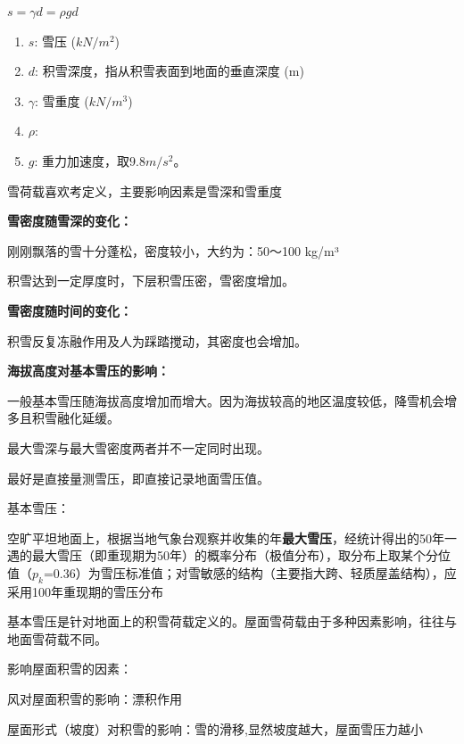 \documentclass[12pt, a4paper, oneside, UTF8]{ctexbook}
\begin{document}
\begin{definition}
    $s = \gamma d = \rho g d$
\begin{enumerate}
    \item $s$: 雪压 ($kN/m^2$)
    \item $d$: 积雪深度，指从积雪表面到地面的垂直深度 (m)
    \item $\gamma$: 雪重度 ($kN/m^3$)
    \item $\rho$: 
    \item $g$: 重力加速度，取$9.8m/s^2$。
\end{enumerate}
\label{eq:snow_pressure}
\end{definition}

\begin{remark}
    雪荷载喜欢考定义，主要影响因素是雪深和雪重度
\end{remark}

\textbf{雪密度随雪深的变化：}

刚刚飘落的雪十分蓬松，密度较小，大约为：50～100 kg/m³

积雪达到一定厚度时，下层积雪压密，雪密度增加。

\textbf{雪密度随时间的变化：}

积雪反复冻融作用及人为踩踏搅动，其密度也会增加。

\textbf{海拔高度对基本雪压的影响：}

一般基本雪压随海拔高度增加而增大。因为海拔较高的地区温度较低，降雪机会增多且积雪融化延缓。

\begin{remark}
    最大雪深与最大雪密度两者并不一定同时出现。

最好是直接量测雪压，即直接记录地面雪压值。
\end{remark}

\begin{definition}
    基本雪压：

空旷平坦地面上，根据当地气象台观察并收集的年\textbf{最大雪压}，经统计得出的50年一遇的最大雪压（即重现期为50年）的概率分布（极值分布），取分布上取某个分位值（\( p_k \)=0.36）为雪压标准值；对雪敏感的结构（主要指大跨、轻质屋盖结构），应采用100年重现期的雪压分布
\end{definition}

基本雪压是针对地面上的积雪荷载定义的。屋面雪荷载由于多种因素影响，往往与地面雪荷载不同。

影响屋面积雪的因素：

风对屋面积雪的影响：漂积作用

屋面形式（坡度）对积雪的影响：雪的滑移,{\color{red}显然坡度越大，屋面雪压力越小}
\end{document}
